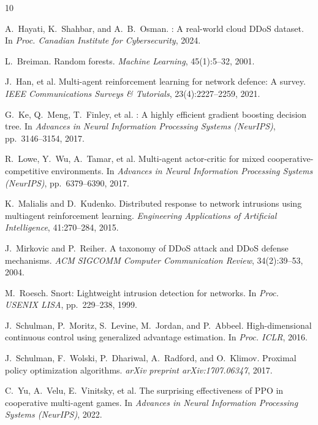 \documentclass[sigconf,nonacm]{acmart}
\begin{document}
\begin{thebibliography}{10}

A.~Hayati, K.~Shahbar, and A.~B.~Osman.
: A real-world cloud DDoS dataset.
\newblock In \emph{Proc. Canadian Institute for Cybersecurity}, 2024.

L.~Breiman.
\newblock Random forests.
\newblock \emph{Machine Learning}, 45(1):5--32, 2001.

J.~Han, et al.
\newblock Multi-agent reinforcement learning for network defence: A survey.
\newblock \emph{IEEE Communications Surveys \& Tutorials}, 23(4):2227--2259, 2021.

G.~Ke, Q.~Meng, T.~Finley, et al.
: A highly efficient gradient boosting decision tree.
\newblock In \emph{Advances in Neural Information Processing Systems (NeurIPS)}, pp.~3146--3154, 2017.

R.~Lowe, Y.~Wu, A.~Tamar, et al.
\newblock Multi-agent actor-critic for mixed cooperative-competitive environments.
\newblock In \emph{Advances in Neural Information Processing Systems (NeurIPS)}, pp.~6379--6390, 2017.

K.~Malialis and D.~Kudenko.
\newblock Distributed response to network intrusions using multiagent reinforcement learning.
\newblock \emph{Engineering Applications of Artificial Intelligence}, 41:270--284, 2015.

J.~Mirkovic and P.~Reiher.
\newblock A taxonomy of {DDoS} attack and {DDoS} defense mechanisms.
\newblock \emph{ACM SIGCOMM Computer Communication Review}, 34(2):39--53, 2004.

M.~Roesch.
\newblock Snort: Lightweight intrusion detection for networks.
\newblock In \emph{Proc. USENIX LISA}, pp.~229--238, 1999.

J.~Schulman, P.~Moritz, S.~Levine, M.~Jordan, and P.~Abbeel.
\newblock High-dimensional continuous control using generalized advantage estimation.
\newblock In \emph{Proc. ICLR}, 2016.

J.~Schulman, F.~Wolski, P.~Dhariwal, A.~Radford, and O.~Klimov.
\newblock Proximal policy optimization algorithms.
\newblock \emph{arXiv preprint arXiv:1707.06347}, 2017.

C.~Yu, A.~Velu, E.~Vinitsky, et al.
\newblock The surprising effectiveness of {PPO} in cooperative multi-agent games.
\newblock In \emph{Advances in Neural Information Processing Systems (NeurIPS)}, 2022.


\end{thebibliography}
\end{document}
